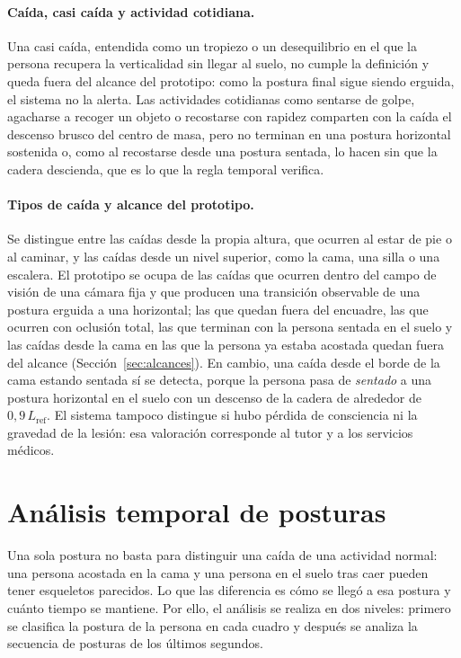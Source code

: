 \documentclass[12pt,a4paper,oneside]{book}
\theoremstyle{plain}
\theoremstyle{definition}
\theoremstyle{remark}
\begin{document}
\paragraph{Caída, casi caída y actividad cotidiana.} Una casi caída, entendida como un tropiezo o un desequilibrio en el que la persona recupera la verticalidad sin llegar al suelo, no cumple la definición y queda fuera del alcance del prototipo: como la postura final sigue siendo erguida, el sistema no la alerta. Las actividades cotidianas como sentarse de golpe, agacharse a recoger un objeto o recostarse con rapidez comparten con la caída el descenso brusco del centro de masa, pero no terminan en una postura horizontal sostenida o, como al recostarse desde una postura sentada, lo hacen sin que la cadera descienda, que es lo que la regla temporal verifica.

\paragraph{Tipos de caída y alcance del prototipo.} Se distingue entre las caídas desde la propia altura, que ocurren al estar de pie o al caminar, y las caídas desde un nivel superior, como la cama, una silla o una escalera. El prototipo se ocupa de las caídas que ocurren dentro del campo de visión de una cámara fija y que producen una transición observable de una postura erguida a una horizontal; las que quedan fuera del encuadre, las que ocurren con oclusión total, las que terminan con la persona sentada en el suelo y las caídas desde la cama en las que la persona ya estaba acostada quedan fuera del alcance (Sección~\ref{sec:alcances}). En cambio, una caída desde el borde de la cama estando sentada sí se detecta, porque la persona pasa de \textit{sentado} a una postura horizontal en el suelo con un descenso de la cadera de alrededor de $0{,}9\,L_{\text{ref}}$. El sistema tampoco distingue si hubo pérdida de consciencia ni la gravedad de la lesión: esa valoración corresponde al tutor y a los servicios médicos.

\section{Análisis temporal de posturas}
\label{sec:secuencias}
 
Una sola postura no basta para distinguir una caída de una actividad normal: una persona acostada en la cama y una persona en el suelo tras caer pueden tener esqueletos parecidos. Lo que las diferencia es cómo se llegó a esa postura y cuánto tiempo se mantiene. Por ello, el análisis se realiza en dos niveles: primero se clasifica la postura de la persona en cada cuadro y después se analiza la secuencia de posturas de los últimos segundos.
 
\end{document}
